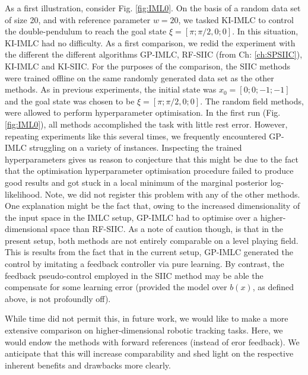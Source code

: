 As a first illustration, consider Fig. \ref{fig:IML0}. On the basis of a random data set of size 20, and with reference parameter $w =20$, we tasked KI-IMLC to control the double-pendulum to reach the goal state $\xi=[\pi;\pi/2,0;0]$. In this situation, KI-IMLC had no difficulty. As a first comparison, we redid the experiment with the different the different algorithms GP-IMLC, RF-SIIC (from Ch: \ref{ch:SPSIIC}), KI-IMLC and KI-SIIC. For the purposes of the comparison, the SIIC methods were trained offline on the same randomly generated data set as the other methods. As in previous experiments, the initial state was $x_0=[0;0;-1;-1]$ and the goal state was chosen to be $\xi=[\pi;\pi/2,0;0]$. The random field methods, were allowed to perform hyperparameter optimisation.
In the first run (Fig. \ref{fig:IML0}), all methods accomplished the task with little rest error.
However, repeating experiments like this several times, we frequently encountered GP-IMLC struggling on a variety of instances. Inspecting the trained hyperparameters gives us reason to conjecture that this might be due to the fact that the optimisation hyperparameter optimisation procedure failed to produce good results and got stuck in a local minimum of the marginal posterior log-likelihood. Note, we did not register this problem with any of the other methods. One explanation might be the fact that, owing to the increased dimensionality of the input space in the IMLC setup, GP-IMLC had to optimise over a higher-dimensional space than RF-SIIC. As a note of caution though, is that in the present setup, both methods are not entirely comparable on a level playing field. This is results from the fact that in the current setup, GP-IMLC generated the control by imitating a feedback controller via pure learning. By contrast, the feedback pseudo-control employed in the SIIC method may be able the compensate for some learning error (provided the model over $b(x)$, as defined above, is not profoundly off). 

While time did not permit this, in future work, we would like to make a more extensive comparison on higher-dimensional robotic tracking tasks. Here, we would endow the methods with forward references (instead of eror feedback). We anticipate that this will increase comparability and shed light on the respective inherent benefits and drawbacks more clearly. 

